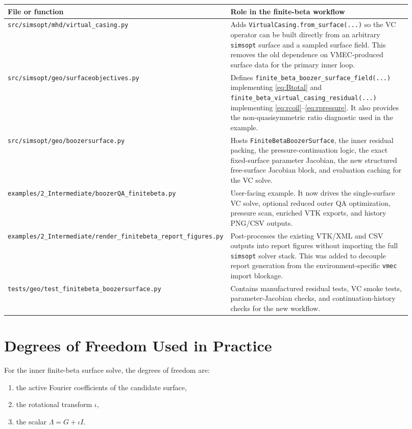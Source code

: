 \documentclass[11pt]{article}
\begin{document}
\begin{longtable}{>{\raggedright\arraybackslash}p{0.30\linewidth} >{\raggedright\arraybackslash}p{0.62\linewidth}}
\toprule
File or function & Role in the finite-beta workflow \\
\midrule
\endhead
\texttt{src/simsopt/mhd/virtual\_casing.py} & Adds \texttt{VirtualCasing.from\_surface(...)} so the VC operator can be built directly from an arbitrary \texttt{simsopt} surface and a sampled surface field. This removes the old dependence on VMEC-produced surface data for the primary inner loop. \\
\texttt{src/simsopt/geo/surfaceobjectives.py} & Defines \texttt{finite\_beta\_boozer\_surface\_field(...)} implementing \eqref{eq:Btotal} and \texttt{finite\_beta\_virtual\_casing\_residual(...)} implementing \eqref{eq:rcoil}--\eqref{eq:rpressure}. It also provides the non-quasisymmetric ratio diagnostic used in the example. \\
\texttt{src/simsopt/geo/boozersurface.py} & Hosts \texttt{FiniteBetaBoozerSurface}, the inner residual packing, the pressure-continuation logic, the exact fixed-surface parameter Jacobian, the new structured free-surface Jacobian block, and evaluation caching for the VC solve. \\
\texttt{examples/2\_Intermediate/boozerQA\_finitebeta.py} & User-facing example. It now drives the single-surface VC solve, optional reduced outer QA optimization, pressure scan, enriched VTK exports, and history PNG/CSV outputs. \\
\texttt{examples/2\_Intermediate/render\_finitebeta\_report\_figures.py} & Post-processes the existing VTK/XML and CSV outputs into report figures without importing the full \texttt{simsopt} solver stack. This was added to decouple report generation from the environment-specific \texttt{vmec} import blockage. \\
\texttt{tests/geo/test\_finitebeta\_boozersurface.py} & Contains manufactured residual tests, VC smoke tests, parameter-Jacobian checks, and continuation-history checks for the new workflow. \\
\bottomrule
\end{longtable}

\section{Degrees of Freedom Used in Practice}
For the inner finite-beta surface solve, the degrees of freedom are:

\begin{enumerate}
\item the active Fourier coefficients of the candidate surface,
\item the rotational transform $\iota$,
\item the scalar $\Lambda = G + \iota I$.
\end{enumerate}
\end{document}
